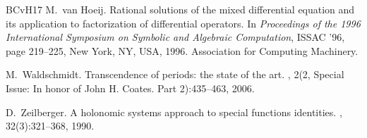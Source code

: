 \documentclass[12pt]{amsart}
\theoremstyle{plain}
\theoremstyle{remark}
\begin{document}
\begin{thebibliography}{BCvH{\etalchar{+}}17}
M.~van Hoeij.
\newblock Rational solutions of the mixed differential equation and its
  application to factorization of differential operators.
\newblock In {\em Proceedings of the 1996 International Symposium on Symbolic
  and Algebraic Computation}, ISSAC '96, page 219–225, New York, NY, USA,
  1996. Association for Computing Machinery.

M.~Waldschmidt.
\newblock Transcendence of periods: the state of the art.
, 2(2, Special Issue: In honor of John H.
  Coates. Part 2):435--463, 2006.

D.~Zeilberger.
\newblock A holonomic systems approach to special functions identities.
, 32(3):321--368, 1990.

\end{thebibliography}
\end{document}
